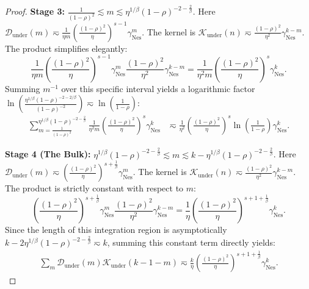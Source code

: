 \begin{proof}
\textbf{Stage 3:} $\frac{1}{(1-\rho)^2} \lesssim m \lesssim \eta^{1/\beta}(1-\rho)^{-2-\frac{2}{\beta}}$. 
Here $\mathcal{D}_{\mathrm{under}}(m) \eqsim \frac{1}{\eta m} \left(\frac{(1-\rho)^2}{\eta}\right)^{s-1} \gamma_{\mathrm{Nes}}^m$. The kernel is $\mathcal{K}_{\mathrm{under}}(n) \eqsim \frac{(1-\rho)^2}{\eta^2} \gamma_{\mathrm{Nes}}^{k-m}$. 
The product simplifies elegantly:
\begin{equation*}
    \frac{1}{\eta m} \left(\frac{(1-\rho)^2}{\eta}\right)^{s-1} \gamma_{\mathrm{Nes}}^m \frac{(1-\rho)^2}{\eta^2} \gamma_{\mathrm{Nes}}^{k-m} = \frac{1}{\eta^2 m} \left(\frac{(1-\rho)^2}{\eta}\right)^s \gamma_{\mathrm{Nes}}^k.
\end{equation*}
Summing $m^{-1}$ over this specific interval yields a logarithmic factor $\ln\left( \frac{\eta^{1/\beta}(1-\rho)^{-2-2/\beta}}{(1-\rho)^{-2}} \right) \eqsim \ln\left(\frac{1}{1-\rho}\right)$:
\begin{align*}
    \sum_{m=\frac{1}{(1-\rho)^2}}^{\eta^{1/\beta}(1-\rho)^{-2-\frac{2}{\beta}}} \frac{1}{\eta^2 m} \left(\frac{(1-\rho)^2}{\eta}\right)^s \gamma_{\mathrm{Nes}}^k 
    &\eqsim \frac{1}{\eta^2} \left(\frac{(1-\rho)^2}{\eta}\right)^s \ln\left(\frac{1}{1-\rho}\right) \gamma_{\mathrm{Nes}}^k.
\end{align*}

\textbf{Stage 4 (The Bulk):} $\eta^{1/\beta}(1-\rho)^{-2-\frac{2}{\beta}} \lesssim m \lesssim k - \eta^{1/\beta}(1-\rho)^{-2-\frac{2}{\beta}}$. 
Here $\mathcal{D}_{\mathrm{under}}(m) \eqsim \left(\frac{(1-\rho)^2}{\eta}\right)^{s+\frac{1}{\beta}} \gamma_{\mathrm{Nes}}^m$. The kernel is $\mathcal{K}_{\mathrm{under}}(n) \eqsim \frac{(1-\rho)^2}{\eta^2} \gamma_{\mathrm{Nes}}^{k-m}$. 
The product is strictly constant with respect to $m$:
\begin{equation*}
    \left(\frac{(1-\rho)^2}{\eta}\right)^{s+\frac{1}{\beta}} \gamma_{\mathrm{Nes}}^m \frac{(1-\rho)^2}{\eta^2} \gamma_{\mathrm{Nes}}^{k-m} = \frac{1}{\eta} \left(\frac{(1-\rho)^2}{\eta}\right)^{s+1+\frac{1}{\beta}} \gamma_{\mathrm{Nes}}^k.
\end{equation*}
Since the length of this integration region is asymptotically $k - 2\eta^{1/\beta}(1-\rho)^{-2-\frac{2}{\beta}} \eqsim k$, summing this constant term directly yields:
\begin{align*}
    \sum_{m} \mathcal{D}_{\mathrm{under}}(m) \mathcal{K}_{\mathrm{under}}(k-1-m) \eqsim \frac{k}{\eta} \left(\frac{(1-\rho)^2}{\eta}\right)^{s+1+\frac{1}{\beta}} \gamma_{\mathrm{Nes}}^k.
\end{align*}


\end{proof}
